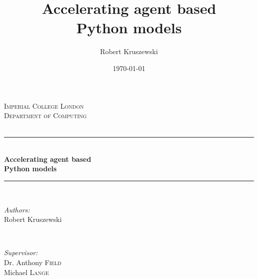 \documentclass[12pt, a4paper]{report}
\title{Accelerating agent based\\Python models}
\date{\today}
\author{Robert Kruszewski}
\begin{document}
\begin{titlepage}

\newcommand{\HRule}{\rule{\linewidth}{0.5mm}} %

\center %


\textsc{\LARGE Imperial College London}\\[1.5cm] %
\textsc{\Large Department of Computing}\\[0.5cm] %
\textsc{\large}\\[0.5cm] %


\HRule \\[0.4cm]
{ \huge \bfseries Accelerating agent based\\\vspace{0.4cm}Python models}\\[0.4cm] %
\HRule \\[1.5cm]


\begin{minipage}{0.4\textwidth}
\begin{flushleft} \large
\emph{Authors:}\\
Robert Kruszewski\\
\end{flushleft}
\end{minipage}
~
\begin{minipage}{0.4\textwidth}
\begin{flushright} \large
\emph{Supervisor:} \\
Dr. Anthony \textsc{Field} \\%
Michael \textsc{Lange} \\%
\end{flushright}
\end{minipage}\\[5cm]


\end{titlepage}
\end{document}

